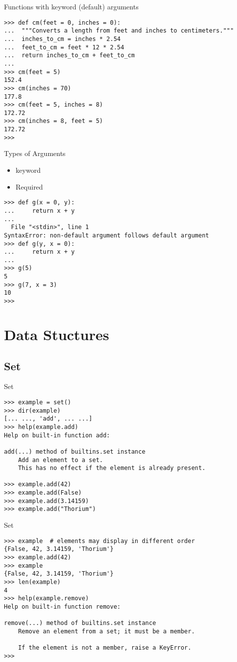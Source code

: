 \documentclass{beamer}
\begin{document}
\begin{frame}[fragile]{Functions with keyword (default) arguments}
\begin{verbatim}
>>> def cm(feet = 0, inches = 0):
...  """Converts a length from feet and inches to centimeters."""
...  inches_to_cm = inches * 2.54
...  feet_to_cm = feet * 12 * 2.54
...  return inches_to_cm + feet_to_cm
...
>>> cm(feet = 5)
152.4
>>> cm(inches = 70)
177.8
>>> cm(feet = 5, inches = 8)
172.72
>>> cm(inches = 8, feet = 5)
172.72
>>>
\end{verbatim}
\end{frame}

\begin{frame}[fragile]{Types of Arguments}
\begin{itemize}
  \item keyword
  \item Required
\end{itemize}
\begin{verbatim}
>>> def g(x = 0, y):
...     return x + y
...
  File "<stdin>", line 1
SyntaxError: non-default argument follows default argument
>>> def g(y, x = 0):
...     return x + y
...
>>> g(5)
5
>>> g(7, x = 3)
10
>>>
\end{verbatim}
\end{frame}

\section{Data Stuctures}
\subsection{Set}

\begin{frame}[fragile]{Set}
\begin{verbatim}
>>> example = set()
>>> dir(example)
[... ..., 'add', ... ...]
>>> help(example.add)
Help on built-in function add:

add(...) method of builtins.set instance
    Add an element to a set.
    This has no effect if the element is already present.

>>> example.add(42)
>>> example.add(False)
>>> example.add(3.14159)
>>> example.add("Thorium")
\end{verbatim}
\end{frame}

\begin{frame}[fragile]{Set}
\begin{verbatim}
>>> example  # elements may display in different order
{False, 42, 3.14159, 'Thorium'}
>>> example.add(42)
>>> example
{False, 42, 3.14159, 'Thorium'}
>>> len(example)
4
>>> help(example.remove)
Help on built-in function remove:

remove(...) method of builtins.set instance
    Remove an element from a set; it must be a member.

    If the element is not a member, raise a KeyError.
>>>
\end{verbatim}
\end{frame}
\end{document}
